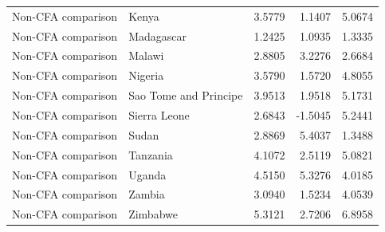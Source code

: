 \begin{table}
\begin{tabular}[t]{llrrr}
Non-CFA comparison & Kenya & 3.5779 & 1.1407 & 5.0674\\
\addlinespace
Non-CFA comparison & Madagascar & 1.2425 & 1.0935 & 1.3335\\
Non-CFA comparison & Malawi & 2.8805 & 3.2276 & 2.6684\\
Non-CFA comparison & Nigeria & 3.5790 & 1.5720 & 4.8055\\
Non-CFA comparison & Sao Tome and Principe & 3.9513 & 1.9518 & 5.1731\\
Non-CFA comparison & Sierra Leone & 2.6843 & -1.5045 & 5.2441\\
\addlinespace
Non-CFA comparison & Sudan & 2.8869 & 5.4037 & 1.3488\\
Non-CFA comparison & Tanzania & 4.1072 & 2.5119 & 5.0821\\
Non-CFA comparison & Uganda & 4.5150 & 5.3276 & 4.0185\\
Non-CFA comparison & Zambia & 3.0940 & 1.5234 & 4.0539\\
Non-CFA comparison & Zimbabwe & 5.3121 & 2.7206 & 6.8958\\
\bottomrule
\end{tabular}
\end{table}